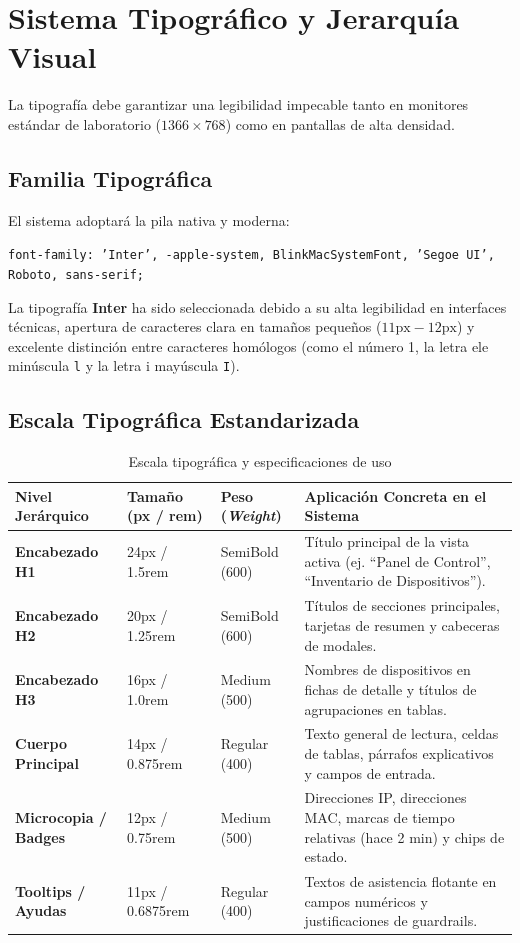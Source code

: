 \documentclass[12pt,a4paper]{report}
\begin{document}
\newpage
\chapter{Sistema Tipográfico y Jerarquía Visual}

La tipografía debe garantizar una legibilidad impecable tanto en monitores estándar de laboratorio ($1366 \times 768$) como en pantallas de alta densidad.

\section{Familia Tipográfica}
El sistema adoptará la pila nativa y moderna:
\begin{center}
  \texttt{font-family: 'Inter', -apple-system, BlinkMacSystemFont, 'Segoe UI', Roboto, sans-serif;}
\end{center}
La tipografía \textbf{Inter} ha sido seleccionada debido a su alta legibilidad en interfaces técnicas, apertura de caracteres clara en tamaños pequeños ($11\text{px} - 12\text{px}$) y excelente distinción entre caracteres homólogos (como el número 1, la letra ele minúscula \texttt{l} y la letra i mayúscula \texttt{I}).

\section{Escala Tipográfica Estandarizada}
\begin{table}[htbp]
\centering
\caption{Escala tipográfica y especificaciones de uso}\label{tab:escala_tipografica}
\small
\begin{tabularx}{\textwidth}{p{2.8cm} p{2.2cm} p{2.5cm} X}
\toprule
\textbf{Nivel Jerárquico} & \textbf{Tamaño (px / rem)} & \textbf{Peso (\textit{Weight})} & \textbf{Aplicación Concreta en el Sistema} \\
\midrule
\textbf{Encabezado H1} & 24px / 1.5rem & SemiBold (600) & Título principal de la vista activa (ej. ``Panel de Control'', ``Inventario de Dispositivos''). \\
\midrule
\textbf{Encabezado H2} & 20px / 1.25rem & SemiBold (600) & Títulos de secciones principales, tarjetas de resumen y cabeceras de modales. \\
\midrule
\textbf{Encabezado H3} & 16px / 1.0rem & Medium (500) & Nombres de dispositivos en fichas de detalle y títulos de agrupaciones en tablas. \\
\midrule
\textbf{Cuerpo Principal} & 14px / 0.875rem & Regular (400) & Texto general de lectura, celdas de tablas, párrafos explicativos y campos de entrada. \\
\midrule
\textbf{Microcopia / Badges} & 12px / 0.75rem & Medium (500) & Direcciones IP, direcciones MAC, marcas de tiempo relativas (hace 2 min) y chips de estado. \\
\midrule
\textbf{Tooltips / Ayudas} & 11px / 0.6875rem & Regular (400) & Textos de asistencia flotante en campos numéricos y justificaciones de guardrails. \\
\bottomrule
\end{tabularx}
\end{table}
\end{document}
